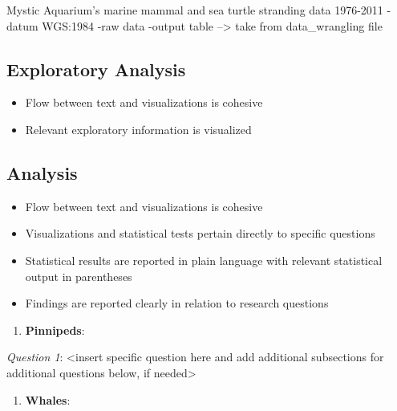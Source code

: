 \documentclass[
  12pt,
]{article}
\providecommand{\tightlist}{%
  \setlength{\itemsep}{0pt}\setlength{\parskip}{0pt}}
\begin{document}
Mystic Aquarium's marine mammal and sea turtle stranding data 1976-2011
-datum WGS:1984 -raw data -output table --\textgreater{} take from
data\_wrangling file

\newpage

\hypertarget{exploratory-analysis}{%
\subsection{Exploratory Analysis}\label{exploratory-analysis}}

\begin{itemize}
\tightlist
\item
  Flow between text and visualizations is cohesive
\item
  Relevant exploratory information is visualized
\end{itemize}

\newpage

\hypertarget{analysis}{%
\subsection{Analysis}\label{analysis}}

\begin{itemize}
\tightlist
\item
  Flow between text and visualizations is cohesive
\item
  Visualizations and statistical tests pertain directly to specific
  questions
\item
  Statistical results are reported in plain language with relevant
  statistical output in parentheses
\item
  Findings are reported clearly in relation to research questions
\end{itemize}

\begin{enumerate}
\def\labelenumi{\arabic{enumi}.}
\tightlist
\item
  \textbf{Pinnipeds}:
\end{enumerate}

\emph{Question 1}: \textless insert specific question here and add
additional subsections for additional questions below, if
needed\textgreater{}

\begin{enumerate}
\def\labelenumi{\arabic{enumi}.}
\setcounter{enumi}{1}
\tightlist
\item
  \textbf{Whales}:
\end{enumerate}
\end{document}
